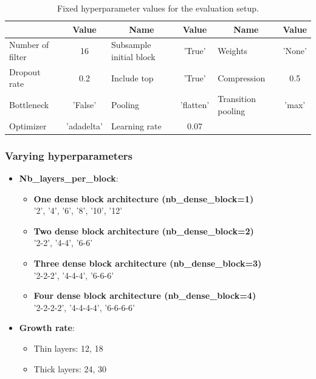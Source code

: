 \begin{table}[ht]
\centering
\caption{Fixed hyperparameter values for the evaluation setup.}
\resizebox{\textwidth}{!}
{\begin{tabular}{|l c| l c| l c|} 
 \hline\hline
 \rowcolor{lightgrey}
 \multicolumn{1}{|c}{\textbf{Name}} & \multicolumn{1}{c|}{\textbf{Value}} & \multicolumn{1}{c}{\textbf{Name}} & \multicolumn{1}{c|}{\textbf{Value}} & \multicolumn{1}{c}{\textbf{Name}} & \multicolumn{1}{c|}{\textbf{Value}} \\ [0.5ex] 
 \hline
 Number of filter & 16 & Subsample initial block & 'True' & Weights & 'None'\\
 \hline
 Dropout rate & 0.2 & Include top & 'True' & Compression & 0.5\\
 \hline
 Bottleneck & 'False' &  Pooling & 'flatten' & Transition pooling & 'max' \\
 \hline
 Optimizer & 'adadelta' & Learning rate & 0.07 & & \\
 \hline \hline
\end{tabular}}
\label{table:architecture_densenet_siamese}
\end{table}

\subsubsection{Varying hyperparameters}

 \begin{itemize}
  \item \textbf{Nb\_layers\_per\_block}:
  \begin{itemize}
   \item \textbf{One dense block architecture (nb\_dense\_block=1)}\\
   '2', '4', '6', '8', '10', '12'
   \item \textbf{Two dense block architecture (nb\_dense\_block=2)}\\
   '2-2', '4-4', '6-6'
   \item \textbf{Three dense block architecture (nb\_dense\_block=3)}\\
   '2-2-2', '4-4-4', '6-6-6'
   \item \textbf{Four dense block architecture (nb\_dense\_block=4)}\\
   '2-2-2-2', '4-4-4-4', '6-6-6-6'
  \end{itemize}
 \item \textbf{Growth rate}:
  \begin{itemize}
  \item Thin layers: 12, 18
  \item Thick layers: 24, 30    
 \end{itemize} 
\end{itemize}
 
